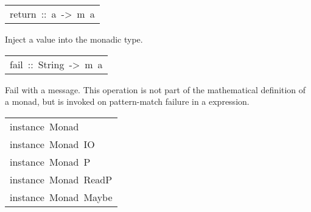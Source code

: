 \begin{haddockdesc}
\begin{haddockdesc}
\end{haddockdesc}
\begin{haddockdesc}
\item[\begin{tabular}{@{}l}
return\ ::\ a\ ->\ m\ a
\end{tabular}]\haddockbegindoc
Inject a value into the monadic type.
\par

\end{haddockdesc}
\begin{haddockdesc}
\item[\begin{tabular}{@{}l}
fail\ ::\ String\ ->\ m\ a
\end{tabular}]\haddockbegindoc
Fail with a message.  This operation is not part of the
 mathematical definition of a monad, but is invoked on pattern-match
 failure in a  expression.
\par

\end{haddockdesc}
\end{haddockdesc}
\begin{haddockdesc}
\item[\begin{tabular}{@{}l}
instance\ Monad\ {\char 91}{\char 93}\\instance\ Monad\ IO\\instance\ Monad\ P\\instance\ Monad\ ReadP\\instance\ Monad\ Maybe
\end{tabular}]
\end{haddockdesc}
